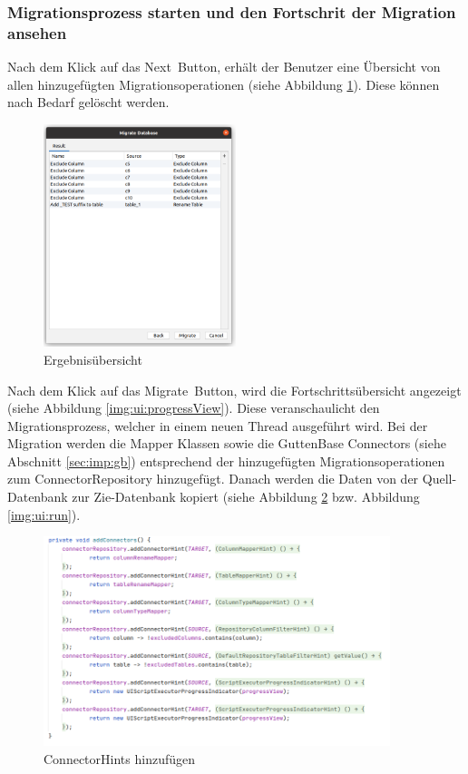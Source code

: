 \subsubsection{Migrationsprozess starten und den Fortschrit der Migration ansehen}
Nach dem Klick auf das \glqq Next\grqq \, Button, erhält der Benutzer eine Übersicht von allen hinzugefügten Migrationsoperationen (siehe Abbildung \ref{img:ui:resultView}). Diese können nach Bedarf gelöscht werden.\\
\begin{figure}[H]
	\centering
	\includegraphics[width=0.5\textwidth]{images/ui/resultView}
	\caption{Ergebnisübersicht}
	\label{img:ui:resultView}
\end{figure}
Nach dem Klick auf das \glqq Migrate\, Button, wird die Fortschrittsübersicht angezeigt (siehe Abbildung \ref{img:ui:progressView}). Diese veranschaulicht den Migrationsprozess, welcher in einem neuen Thread ausgeführt wird. Bei der Migration werden die Mapper Klassen sowie die GuttenBase Connectors (siehe Abschnitt \ref{sec:imp:gb}) entsprechend der hinzugefügten Migrationsoperationen zum ConnectorRepository hinzugefügt. Danach werden die Daten von der Quell-Datenbank zur Zie-Datenbank kopiert (siehe Abbildung \ref{img:ui:connectors} bzw. Abbildung \ref{img:ui:run}). \\
\begin{figure}[H]
	\centering
	\includegraphics[width=0.9\textwidth]{images/ui/connectors}
	\caption{ConnectorHints hinzufügen}
	\label{img:ui:connectors}
\end{figure}

